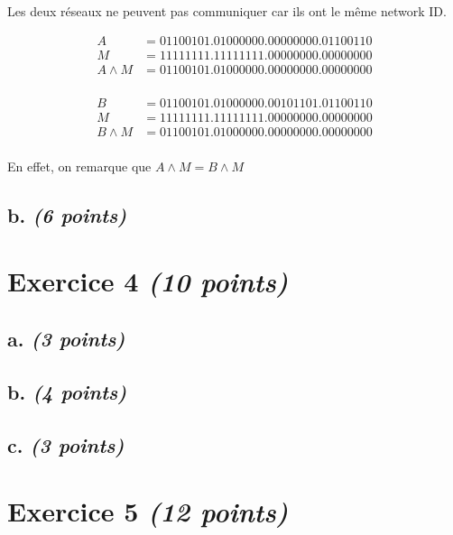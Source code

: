 \documentclass{article}
\begin{document}
Les deux réseaux ne peuvent pas communiquer car ils ont le même network ID.


\noindent \begin{minipage}{9cm}
	\begin{align*}
		A &= 01100101.01000000.00000000.01100110\\
		M &= 11111111.11111111.00000000.00000000\\
		A \land  M &= 01100101.01000000.00000000.00000000\\
	\end{align*}
\end{minipage}
\begin{minipage}{7cm}
	\begin{align*}
		B &= 01100101.01000000.00101101.01100110\\
		M &= 11111111.11111111.00000000.00000000\\
		B \land  M &= 01100101.01000000.00000000.00000000\\
	\end{align*}
\end{minipage}

\hfill

En effet, on remarque que $A \land  M = B \land  M$

\subsection{b. \emph{(6 points)}}

\clearpage

\section{Exercice 4 \emph{(10 points)}}

\subsection{a. \emph{(3 points)}}

\subsection{b. \emph{(4 points)}}

\subsection{c. \emph{(3 points)}}

\clearpage

\section{Exercice 5 \emph{(12 points)}}
\end{document}
